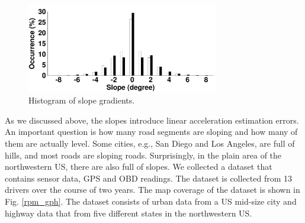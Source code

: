 \begin{figure}[!htbp]
\begin{center}
\includegraphics[width=3.3in,angle=0]{Figs/SlopeAware/degrees.pdf}
\vspace{0.0cm}
\caption{Histogram of slope gradients.}
\label{slopegradients}
\vspace{-0.4cm}
\end{center}
\end{figure}



As we discussed above, the slopes introduce linear acceleration estimation errors.
An important question is how many road segments are sloping and
how many of them are actually level. 
Some cities, e.g., San Diego and Los Angeles, are full of hills, 
and most roads are sloping roads.
Surprisingly, in the plain area of the northwestern US, 
there are also full of slopes. 
We collected a dataset that contains sensor data, GPS and OBD readings.
The dataset is collected from 13 drivers over the course of two years. 
The map coverage of the dataset is shown in Fig. \ref{rpm_gph}. 
The dataset consists of urban data from a US mid-size city and highway data 
that from five different states in the northwestern US.


